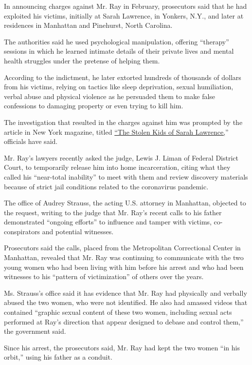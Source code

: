In announcing charges against Mr. Ray in February, prosecutors said that
he had exploited his victims, initially at Sarah Lawrence, in Yonkers,
N.Y., and later at residences in Manhattan and Pinehurst, North
Carolina.

The authorities said he used psychological manipulation, offering
``therapy'' sessions in which he learned intimate details of their
private lives and mental health struggles under the pretense of helping
them.

According to the indictment, he later extorted hundreds of thousands of
dollars from his victims, relying on tactics like sleep deprivation,
sexual humiliation, verbal abuse and physical violence as he persuaded
them to make false confessions to damaging property or even trying to
kill him.

The investigation that resulted in the charges against him was prompted
by the article in New York magazine, titled
\href{https://www.thecut.com/2020/02/larry-ray-sarah-lawrence-students.html\#_ga=2.39120099.1540278468.1598467520-655201318.1598467520}{``The
Stolen Kids of Sarah Lawrence,}'' officials have said.

Mr. Ray's lawyers recently asked the judge, Lewis J. Liman of Federal
District Court, to temporarily release him into home incarceration,
citing what they called his ``near-total inability'' to meet with them
and review discovery materials because of strict jail conditions related
to the coronavirus pandemic.

The office of Audrey Strauss, the acting U.S. attorney in Manhattan,
objected to the request, writing to the judge that Mr. Ray's recent
calls to his father demonstrated ``ongoing efforts'' to influence and
tamper with victims, co-conspirators and potential witnesses.

Prosecutors said the calls, placed from the Metropolitan Correctional
Center in Manhattan, revealed that Mr. Ray was continuing to communicate
with the two young women who had been living with him before his arrest
and who had been witnesses to his ``pattern of victimization'' of others
over the years.

Ms. Strauss's office said it has evidence that Mr. Ray had physically
and verbally abused the two women, who were not identified. He also had
amassed videos that contained ``graphic sexual content of these two
women, including sexual acts performed at Ray's direction that appear
designed to debase and control them,'' the government said.

Since his arrest, the prosecutors said, Mr. Ray had kept the two women
``in his orbit,'' using his father as a conduit.

